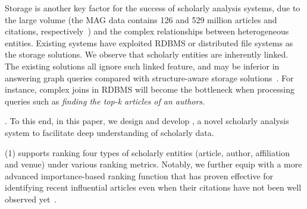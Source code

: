 Storage is another key factor for the success of scholarly analysis systems, due to the large volume (\eg the MAG data contains 126 and 529 million articles and citations, respectively~\cite{sinha2015overview}) and the complex relationships between heterogeneous entities.
Existing systems have exploited RDBMS or distributed file systems as the storage solutions.
%
We observe that scholarly entities are inherently linked. The existing solutions all ignore such linked feature, and may be inferior in answering graph queries compared with structure-aware storage solutions~\cite{BigGraphSearch}. For instance, complex joins in RDBMS will become the bottleneck when processing queries such as {\em finding the top-k articles of an authors}.



.
To this end, in this paper, we design and develop \oursystem, a novel scholarly analysis system to facilitate deep understanding of scholarly data.

\noindent (1) \oursystem supports ranking four types of scholarly entities (\ie article, author, affiliation and venue) under various ranking metrics. Notably, we further equip \oursystem with a more advanced importance-based ranking function that has proven effective for identifying recent influential articles even when their citations have not been well observed yet~\cite{ma2018query}.


